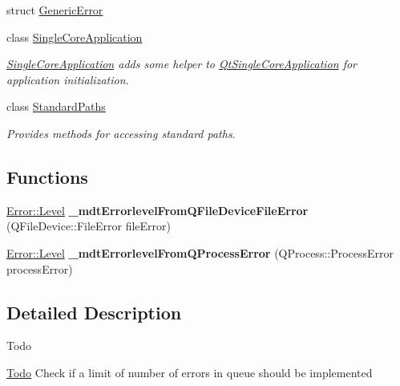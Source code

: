 \begin{DoxyCompactItemize}
struct \hyperlink{struct_mdt_1_1_generic_error}{Generic\+Error}
\item 
class \hyperlink{class_mdt_1_1_single_core_application}{Single\+Core\+Application}
\begin{DoxyCompactList}\small\item\em \hyperlink{class_mdt_1_1_single_core_application}{Single\+Core\+Application} adds some helper to \hyperlink{class_qt_single_core_application}{Qt\+Single\+Core\+Application} for application initialization. \end{DoxyCompactList}\item 
class \hyperlink{class_mdt_1_1_standard_paths}{Standard\+Paths}
\begin{DoxyCompactList}\small\item\em Provides methods for accessing standard paths. \end{DoxyCompactList}\end{DoxyCompactItemize}
\subsection*{Functions}
\begin{DoxyCompactItemize}
\item 
\hyperlink{class_mdt_1_1_error_ab533dc690f68a8635232db594194a068}{Error\+::\+Level} {\bfseries \+\_\+mdt\+Errorlevel\+From\+Q\+File\+Device\+File\+Error} (Q\+File\+Device\+::\+File\+Error file\+Error)\hypertarget{namespace_mdt_a257b45c35cbeebcdd09e848d0eb32a24}{}\label{namespace_mdt_a257b45c35cbeebcdd09e848d0eb32a24}

\item 
\hyperlink{class_mdt_1_1_error_ab533dc690f68a8635232db594194a068}{Error\+::\+Level} {\bfseries \+\_\+mdt\+Errorlevel\+From\+Q\+Process\+Error} (Q\+Process\+::\+Process\+Error process\+Error)\hypertarget{namespace_mdt_a695a2c868ea594d886deb671f1a12913}{}\label{namespace_mdt_a695a2c868ea594d886deb671f1a12913}

\end{DoxyCompactItemize}


\subsection{Detailed Description}
\begin{DoxyRefDesc}{Todo}
\item[\hyperlink{todo__todo000001}{Todo}]Check if a limit of number of errors in queue should be implemented \end{DoxyRefDesc}
